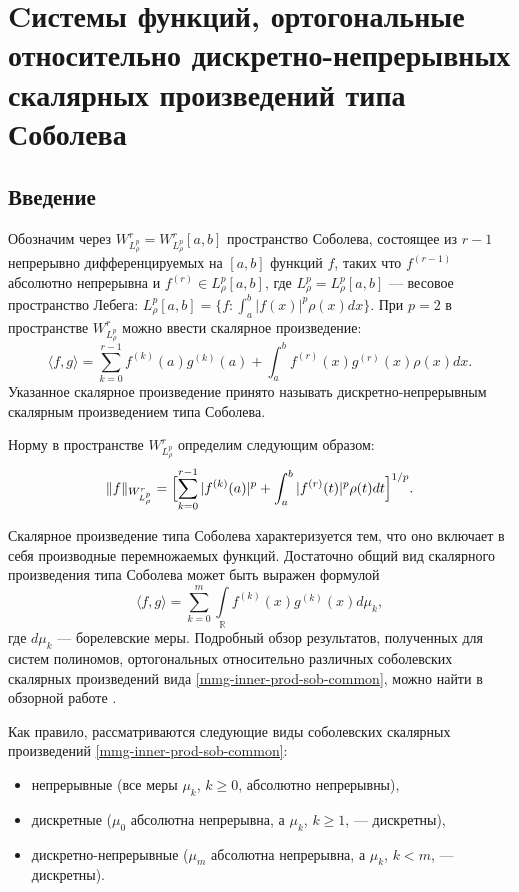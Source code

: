  \chapter{Cистемы функций, ортогональные относительно дискретно-непрерывных скалярных произведений типа Соболева}



\section*{Введение}
Обозначим через $W^r_{L^p_\rho}=W^r_{L^p_\rho}[a,b]$ пространство Соболева, состоящее из $r-1$ непрерывно дифференцируемых на $[a,b]$ функций $f$, таких что $f^{(r-1)}$ абсолютно непрерывна и $f^{(r)} \in L^p_\rho[a,b]$, где $L^p_\rho=L^p_\rho[a,b]$ --- весовое пространство Лебега: $L^p_\rho[a,b] = \{ f: \int_a^b |f(x)|^p\rho(x)dx \}$. При $p=2$ в пространстве $W^r_{L^p_\rho}$ можно ввести скалярное произведение:
\begin{equation}\label{mmg-sob-prod}
	\langle f, g \rangle = \sum_{k=0}^{r-1}f^{(k)}(a)g^{(k)}(a)+\int_a^b f^{(r)}(x)g^{(r)}(x)\rho(x)dx.
\end{equation}
Указанное скалярное произведение принято называть дискретно-непрерывным скалярным произведением типа Соболева.

Норму в пространстве $W^r_{L^p_\rho}$ определим следующим образом:
\begin{equation}\label{mmg-sob-norm-def}
	\|f\|_{W^r_{L^p_\rho}} = \Bigl[
	\sum_{k=0}^{r-1}|f^{(k)}(a)|^p + \int_a^b |f^{(r)}(t)|^p \rho(t)dt
	\Bigr]^{1/p}.
\end{equation}

Скалярное произведение типа Соболева характеризуется тем, что оно включает в себя производные перемножаемых функций. Достаточно общий вид скалярного произведения типа Соболева может быть выражен формулой
\begin{equation}\label{mmg-inner-prod-sob-common}
	\langle f,g \rangle = \sum_{k=0}^{m}\int\limits_{\mathbb{R}}f^{(k)}(x)g^{(k)}(x)d\mu_k,
\end{equation}
где $d\mu_k$ --- борелевские меры. Подробный обзор результатов, полученных для систем полиномов, ортогональных относительно различных соболевских скалярных произведений вида \eqref{mmg-inner-prod-sob-common}, можно найти в обзорной работе \cite{mmg-MarcellanXu2015}.

Как правило, рассматриваются следующие виды соболевских скалярных произведений \eqref{mmg-inner-prod-sob-common}:
\begin{itemize}
	\item
	непрерывные (все меры $\mu_k$, $k \ge 0$, абсолютно непрерывны),
	\item
	дискретные ($\mu_0$ абсолютна непрерывна, а $\mu_k$, $k \ge 1$, --- дискретны),
	\item
	дискретно-непрерывные ($\mu_m$ абсолютна непрерывна, а $\mu_k$, $k < m$, --- дискретны).	
\end{itemize}

